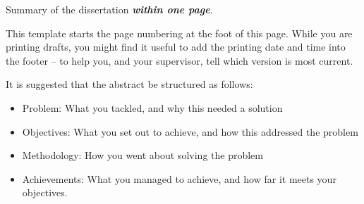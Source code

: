 
Summary of the dissertation \textbf{\textit{within one page}}. 

This template starts the page numbering at the foot of this page. While you are 
printing drafts, you might find it useful to add the printing date and time 
into the footer -- to help you, and your supervisor, tell which version is most 
current.

It is suggested that the abstract be structured as follows:
\begin{itemize}
	\item Problem: What you tackled, and why this needed a solution
	\item Objectives: What you set out to achieve, and how this addressed the 
	problem
	\item Methodology: How you went about solving the problem
	\item Achievements: What you managed to achieve, and how far it meets your 
	objectives.
\end{itemize}
